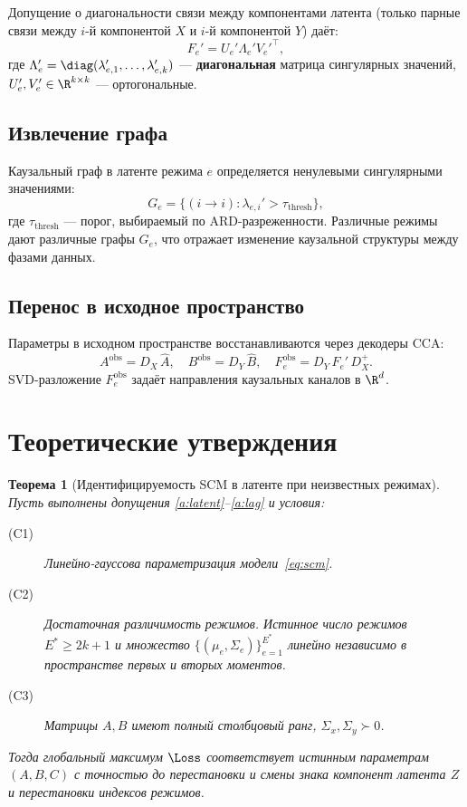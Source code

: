 \documentclass[a4paper,14pt]{article}
\renewcommand{\geq}{\ensuremath{\geqslant}}
\theoremstyle{plain} %
\newtheorem{theorem}{Теорема}[section]
\theoremstyle{definition} %
\theoremstyle{remark} %
\begin{document}
Допущение о диагональности связи между компонентами латента (только парные связи между $i$-й компонентой $X$ и $i$-й компонентой $Y$) даёт:
\begin{equation}
    \label{eq:svd}
    F_e' = U_e' \Lambda_e' V_e'^\top,
\end{equation}
где $\Lambda_e' = \diag(\lambda_{e,1}', \dots, \lambda_{e,k}')$ --- \textbf{диагональная} матрица сингулярных значений, $U_e', V_e' \in \R^{k \times k}$ --- ортогональные.

\subsection{Извлечение графа}

Каузальный граф в латенте режима $e$ определяется ненулевыми сингулярными значениями:
\begin{equation}
    G_e = \{(i \to i) : \lambda_{e,i}' > \tau_{\mathrm{thresh}}\},
\end{equation}
где $\tau_{\mathrm{thresh}}$ --- порог, выбираемый по ARD-разреженности. Различные режимы дают различные графы $G_e$, что отражает изменение каузальной структуры между фазами данных.

\subsection{Перенос в исходное пространство}

Параметры в исходном пространстве восстанавливаются через декодеры CCA:
\begin{equation}
    A^{\mathrm{obs}} = D_X\, \hat A, \quad B^{\mathrm{obs}} = D_Y\, \hat B, \quad F_e^{\mathrm{obs}} = D_Y\, F_e'\, D_X^+.
\end{equation}
SVD-разложение $F_e^{\mathrm{obs}}$ задаёт направления каузальных каналов в $\R^d$.

\section{Теоретические утверждения}

\begin{theorem}[Идентифицируемость SCM в латенте при неизвестных режимах]
\label{thm:identifiability}
Пусть выполнены допущения \ref{a:latent}--\ref{a:lag} и условия:
\begin{description}
    \item[(C1)] Линейно-гауссова параметризация модели~\eqref{eq:scm}.
    \item[(C2)] \emph{Достаточная различимость режимов.} Истинное число режимов $E^* \geq 2k+1$ и множество $\{(\mu_e, \Sigma_e)\}_{e=1}^{E^*}$ линейно независимо в пространстве первых и вторых моментов.
    \item[(C3)] Матрицы $A, B$ имеют полный столбцовый ранг, $\Sigma_x, \Sigma_y \succ 0$.
\end{description}
Тогда глобальный максимум $\Loss$ соответствует истинным параметрам $(A, B, C)$ с точностью до перестановки и смены знака компонент латента $Z$ и перестановки индексов режимов.
\end{theorem}
\end{document}
